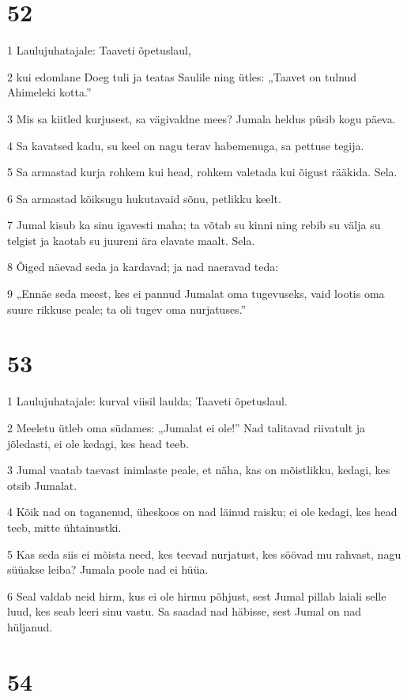 \chapter{52}

\par 1 Laulujuhatajale: Taaveti õpetuslaul,
\par 2 kui edomlane Doeg tuli ja teatas Saulile ning ütles: „Taavet on tulnud Ahimeleki kotta.”
\par 3 Mis sa kiitled kurjusest, sa vägivaldne mees? Jumala heldus püsib kogu päeva.
\par 4 Sa kavatsed kadu, su keel on nagu terav habemenuga, sa pettuse tegija.
\par 5 Sa armastad kurja rohkem kui head, rohkem valetada kui õigust rääkida. Sela.
\par 6 Sa armastad kõiksugu hukutavaid sõnu, petlikku keelt.
\par 7 Jumal kisub ka sinu igavesti maha; ta võtab su kinni ning rebib su välja su telgist ja kaotab su juureni ära elavate maalt. Sela.
\par 8 Õiged näevad seda ja kardavad; ja nad naeravad teda:
\par 9 „Ennäe seda meest, kes ei pannud Jumalat oma tugevuseks, vaid lootis oma suure rikkuse peale; ta oli tugev oma nurjatuses.”

\chapter{53}

\par 1 Laulujuhatajale: kurval viisil laulda; Taaveti õpetuslaul.
\par 2 Meeletu ütleb oma südames: „Jumalat ei ole!” Nad talitavad riivatult ja jõledasti, ei ole kedagi, kes head teeb.
\par 3 Jumal vaatab taevast inimlaste peale, et näha, kas on mõistlikku, kedagi, kes otsib Jumalat.
\par 4 Kõik nad on taganenud, üheskoos on nad läinud raisku; ei ole kedagi, kes head teeb, mitte ühtainustki.
\par 5 Kas seda siis ei mõista need, kes teevad nurjatust, kes söövad mu rahvast, nagu süüakse leiba? Jumala poole nad ei hüüa.
\par 6 Seal valdab neid hirm, kus ei ole hirmu põhjust, sest Jumal pillab laiali selle luud, kes seab leeri sinu vastu. Sa saadad nad häbisse, sest Jumal on nad hüljanud.

\chapter{54}

